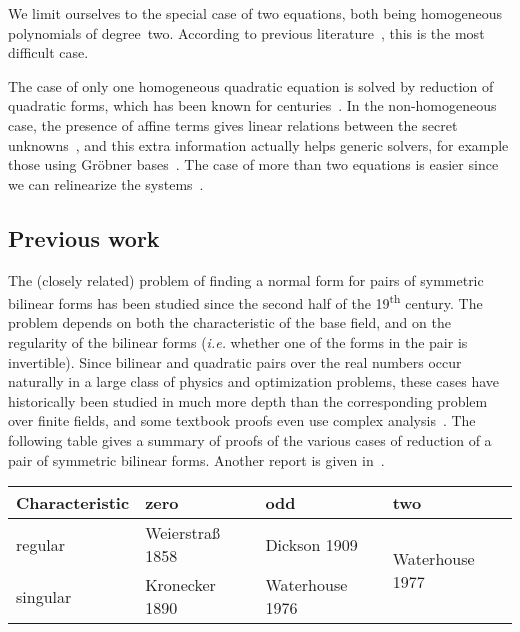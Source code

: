 \documentclass{amsart}
\begin{document}
We limit ourselves to the special case of two equations, both
being homogeneous polynomials of degree~two. According to previous
literature~\cite{DBLP:conf/eurocrypt/Perret05,DBLP:conf/eurocrypt/FaugereP06,DBLP:conf/pkc/BouillaguetFFP11,DBLP:conf/eurocrypt/BouillaguetFV13},
this is the most difficult case.

The case of only one homogeneous quadratic equation
is solved by reduction of quadratic forms,
which has been known for centuries~\cite{gauss,lidl1997finite}.
In the non-homogeneous case, the presence of affine terms
gives linear relations between
the secret unknowns~\cite{DBLP:conf/eurocrypt/PatarinGC98},
and this extra information actually helps generic solvers,
for example those using Gröbner bases~\cite{DBLP:conf/eurocrypt/FaugereP06}.
The case of more than two equations is easier since we can relinearize
the systems~\cite{DBLP:conf/pkc/BouillaguetFFP11}.

\subsection*{Previous work}

The (closely related) problem of finding a normal form
for pairs of symmetric bilinear forms
has been studied since the second half of the 19\textsuperscript{th} century.
The problem depends on both the characteristic of the base field,
and on the regularity of the bilinear forms
(\emph{i.e.} whether one of the forms in the pair is invertible).
Since bilinear and quadratic pairs over the real numbers occur naturally
in a large class of physics and optimization problems,
these cases have historically been studied in much more depth
than the corresponding problem over finite fields,
and some textbook proofs even use complex analysis~\cite[XII(56)]{Gantmacher}.
The following table gives a summary of proofs of the various cases
of reduction of a pair of symmetric bilinear forms.
Another report is given in~\cite{olomouc2004fv}.

\setlength\tabcolsep{.2em}\smallbreak
\begin{center}\begin{tabular}{llll}
Characteristic & zero & odd & two \\
\toprule
regular & Weierstraß 1858\cite{1858weierstrass}
  & Dickson 1909\cite{ams1909dickson}
  & \multirow{2}{*}{Waterhouse 1977\cite{pacific1977waterhouse}} \\
singular & Kronecker 1890\cite{1890kronecker}
  & Waterhouse 1976\cite{inventiones1976waterhouse} & \\
\bottomrule
\end{tabular}\end{center}\medbreak
\end{document}
